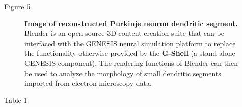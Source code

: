 \documentclass[10pt]{article}
\begin{document}
\clearpage

Figure 5

\begin{figure}[ht]
\begin{center}
\end{center}
\caption{
{\bf Image of reconstructed Purkinje neuron dendritic segment.} Blender is an open source 3D content creation suite that can be interfaced with the GENESIS neural simulation platform to replace the functionality otherwise provided by the {\bf G-Shell} (a stand-alone GENESIS component). The rendering functions of Blender can then be used to analyze the morphology of small dendritic segments imported from electron microscopy data.
}
\label{fig:cbi-blender}
\end{figure}

\clearpage

Table 1
\end{document}

